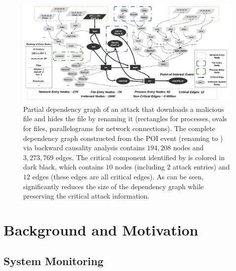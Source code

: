  

\begin{figure}[!t]
    \centering
    \includegraphics[width=\textwidth, keepaspectratio]{figs/overview.pdf}
    \caption{Partial dependency graph of an attack that downloads a malicious file and hides the file by renaming it (rectangles for processes, ovals for files, parallelograms for network connections).
    The complete dependency graph constructed from the POI event (renaming to ) via backward causality analysis contains $194,208$ nodes and $3,273,769$ edges.
    The critical component identified by \tool is colored in dark black, which contains $10$ nodes (including $2$ attack entries) and $12$ edges (these edges are all critical edges).
    As can be seen, \tool significantly reduces the size of the dependency graph while preserving the critical attack information.
    }

    \label{fig:motivate}
\end{figure}


\section{Background and Motivation}

\subsection{System Monitoring}
\label{subsec:system-monitoring}


